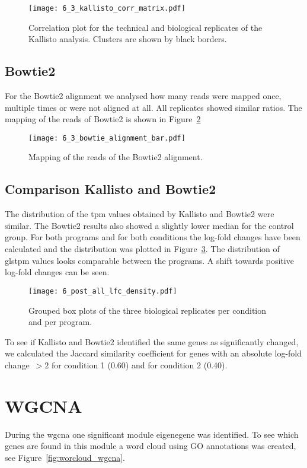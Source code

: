 \begin{figure}[H]
  \center
  \texttt{[image: 6\_3\_kallisto\_corr\_matrix.pdf]}
  \caption{Correlation plot for the technical and biological replicates of the Kallisto
  analysis. Clusters are shown by black borders.}\label{fig:corr_kallisto}
\end{figure}

\subsection{Bowtie2}

For the Bowtie2 alignment we analysed how many reads were mapped once, multiple times or were 
not aligned at all. All replicates showed similar ratios. 
The mapping of the reads of Bowtie2 is shown in Figure~\ref{fig:bar_bowtie}

\begin{figure}[H]
  \center
  \texttt{[image: 6\_3\_bowtie\_alignment\_bar.pdf]}
  \caption{Mapping of the reads of the Bowtie2 alignment.}\label{fig:bar_bowtie}
\end{figure}

\subsection{Comparison Kallisto and Bowtie2}
The distribution of the \gls{tpm} values obtained by Kallisto and Bowtie2 were similar. 
The Bowtie2 results also showed a slightly lower median for the control group.
For both programs and for both conditions the log-fold changes have been calculated 
and the distribution was plotted in Figure~\ref{fig:dist_lfc}.
The distribution of gls{tpm} values looks comparable between the programs. A shift towards positive 
log-fold changes can be seen. 

\begin{figure}[H]
  \center
  \texttt{[image: 6\_post\_all\_lfc\_density.pdf]}
  \caption{Grouped box plots of the three biological replicates per condition and per program.}\label{fig:dist_lfc}
\end{figure}

To see if Kallisto and Bowtie2 identified the same genes as significantly changed, 
we calculated the Jaccard similarity coefficient for genes with an absolute log-fold 
change~$> 2$ for condition 1 (0.60) and for condition 2 (0.40). 

\pagebreak

\section{WGCNA}
During the \gls{wgcna} one significant module eigenegene
was identified. To see which genes are found in this module a word cloud using GO annotations 
was created, see 
Figure~\ref{fig:worcloud_wgcna}.

